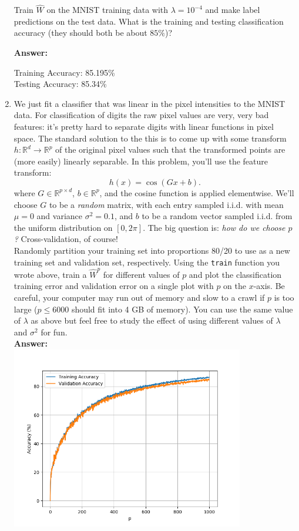 \documentclass{article}
\newcommand{\1}{\mathbf{1}}
\begin{document}
\begin{enumerate}
Train $\widehat{W}$ on the MNIST training data with $\lambda = 10^{-4}$ and make label predictions on the test data. What is the training and testing classification accuracy (they should both be about $85\%$)? 

\textbf{Answer:}

Training Accuracy: 85.195\%\\
Testing Accuracy: 85.34\%

\item We just fit a classifier that was linear in the pixel intensities to the MNIST data.
For classification of digits the raw pixel values are very, very bad features: it's pretty hard to separate digits with linear functions in pixel space.
The standard solution to the this is to come up with some transform $h : \mathbb{R}^d \rightarrow \mathbb{R}^p$ of the original pixel values such that the transformed points are (more easily) linearly separable.
In this problem, you'll use the feature transform:
\[
 h(x) = \cos(G x + b).
\]
where $G \in \mathbb{R}^{p \times d}$, $b \in \mathbb{R}^p$, and the cosine function is applied elementwise. 
We'll choose $G$ to be a \emph{random} matrix, with each entry sampled i.i.d. with mean $\mu=0$ and variance $\sigma^2=0.1$, and $b$ to be a random vector sampled i.i.d. from the uniform distribution on $[0,2\pi].$
The big question is: \emph{how do we choose $p$?} Cross-validation, of course!\\

Randomly partition your training set into proportions 80/20 to use as a new training set and validation set, respectively. 
Using the \verb|train| function you wrote above, train a $\widehat{W}^{p}$ for different values of $p$ and plot the classification training error and validation error on a single plot with $p$ on the $x$-axis. 
Be careful, your computer may run out of memory and slow to a crawl if $p$ is too large ($p\leq 6000$ should fit into 4 GB of memory). 
You can use the same value of $\lambda$ as above but feel free to study the effect of using different values of $\lambda$ and $\sigma^2$ for fun.\\

\textbf{Answer:}\\
\includegraphics[width=4in]{CrossVal.png}


\end{enumerate}
\end{document}
